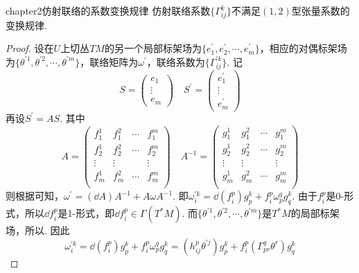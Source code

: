 \begin{mythm}{}{chapter2仿射联络的系数变换规律}
	仿射联络系数$\{\Gamma^{k}_{ij}\}$不满足$(1,2)$型张量系数的变换规律.
\end{mythm}
\begin{proof}
	设在$U$上切丛$TM$的另一个局部标架场为$\{e^{\prime}_{1},e^{\prime}_{2},\cdots,e^{\prime}_{m} \}$，相应的对偶标架场为$\{\theta^{\prime1},\theta^{\prime2},\cdots,\theta^{\prime m} \}$，联络矩阵为$\omega^{\prime}$，联络系数为$\{\Gamma^{\prime k}_{ij}\}$. 记
	\[
		S=\left( \begin{array}{ccc}{e_{1}} \\ {\vdots}  \\ {e_{m}} \end{array}\right)\quad S^{\prime}=\left( \begin{array}{ccc}{e^{\prime}_{1}} \\ {\vdots}  \\ {e^{\prime}_{m}} \end{array}\right)
	\]
	再设$S^{\prime}=AS$. 其中
	\[
	A=\left( \begin{array}{cccc}{f_{1}^{1}} & {f_{1}^{2}}&{\cdots}&{f_{1}^{m}}\\ {f_{2}^{1}} & {f_{2}^{2}}&{\cdots}&{f_{2}^{m}}\\ {\vdots} & {\vdots}&{ }&{\vdots}\\{f_{m}^{1}} & {f_{m}^{2}}&{\cdots}&{f_{m}^{m}}\\ \end{array}\right)\quad A^{-1}=\left( \begin{array}{cccc}{g_{1}^{1}} & {g_{1}^{2}}&{\cdots}&{g_{1}^{m}}\\ {g_{2}^{1}} & {g_{2}^{2}}&{\cdots}&{g_{2}^{m}}\\ {\vdots} & {\vdots}&{ }&{\vdots}\\{g_{m}^{1}} & {g_{m}^{2}}&{\cdots}&{g_{m}^{m}}\\ \end{array}\right)
	\]
	则根据可知，$\omega^{\prime}=(\dd A)A^{-1}+A\omega A^{-1}$. 即$\omega^{\prime k}_{i}=\dd (f_{i}^{p})g_{p}^{k}+f_{i}^{p}\omega_{p}^{q}g_{q}^{k}$. 由于$f_{i}^{p}$是0-形式，所以$\dd f_{i}^{p}$是1-形式，即$\dd f_{i}^{p}\in \Gamma(T^{\ast}M)$. 而$\{\theta^{\prime1},\theta^{\prime2},\cdots,\theta^{\prime m} \}$是$T^{\ast}M$的局部标架场，所以{}. 因此
	\[
	\omega^{\prime k}_{i}=\dd (f_{i}^{p})g_{p}^{k}+f_{i}^{p}\omega_{p}^{q}g_{q}^{k}
	=(h_{ij}^{p}\theta^{\prime j})g_{p}^{k}+f_{i}^{p}(\Gamma_{pr}^{q}\theta^{r})g_{q}^{k}
\]
\end{proof}
